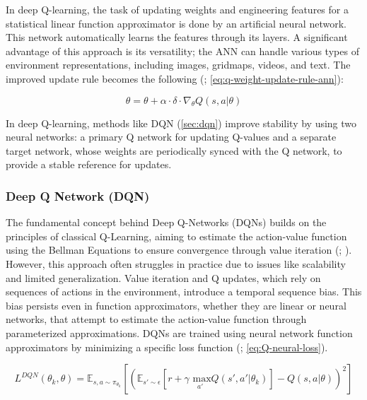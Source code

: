         \noindent In deep Q-learning, the task of updating weights and engineering features for a statistical linear function approximator is done by an artificial neural network. This network automatically learns the features through its layers. A significant advantage of this approach is its versatility; the ANN can handle various types of environment representations, including images, gridmaps, videos, and text. The improved update rule becomes the following (\textcolor{deepblue}{\cite{valuemethods}; \autoref{eq:q-weight-update-rule-ann}}):
        
        \begin{equation}
            \theta = \theta + \alpha \cdot \delta \cdot \nabla_{\theta} Q(s, a | \theta)
            \label{eq:q-weight-update-rule-ann}
        \end{equation}
        
        \noindent In deep Q-learning, methods like DQN (\autoref{sec:dqn}) improve stability by using two neural networks: a primary Q network for updating Q-values and a separate target network, whose weights are periodically synced with the Q network, to provide a stable reference for updates.

        \subsubsection{Deep Q Network (DQN)}
        \label{sec:dqn}
            
            \noindent The fundamental concept behind Deep Q-Networks (DQNs) builds on the principles of classical Q-Learning, aiming to estimate the action-value function using the Bellman Equations to ensure convergence through value iteration (\textcolor{deepblue}{\cite{mnih2013playing}; \cite{stable-baselines3}}). However, this approach often struggles in practice due to issues like scalability and limited generalization. Value iteration and Q updates, which rely on sequences of actions in the environment, introduce a temporal sequence bias. This bias persists even in function approximators, whether they are linear or neural networks, that attempt to estimate the action-value function through parameterized approximations. DQNs are trained using neural network function approximators by minimizing a specific loss function (\textcolor{deepblue}{\cite{mnih2013playing}; \autoref{eq:Q-neural-loss}}).
            
            \begin{equation}
                L^{DQN}(\theta_k, \theta) = \mathbb{E}_{s, a \sim \pi_{\theta_k}} \left [ \left (  \mathbb{E}_{s' \sim \epsilon} \left [ r + \gamma \underset{a'}{\text{ max}} Q(s', a' | \theta_k ) \right] - Q(s, a | \theta)  \right )^2\right]
                \label{eq:Q-neural-loss}
            \end{equation}
            
